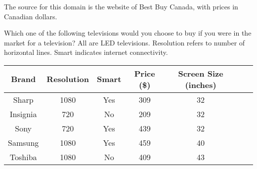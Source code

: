 The source for this domain is the website of Best Buy Canada, with prices in Canadian dollars.

\begin{tcolorbox}
Which one of the following televisions would you choose to buy if you
were in the market for a television? All are LED televisions. Resolution
refers to number of horizontal lines. Smart indicates internet connectivity.

\begin{tabular}{ccccccc}
\hline
Brand & Resolution & Smart & Price (\$) & Screen Size (inches) &  \\ \hline
Sharp & 1080 & Yes & 309 & 32 &  \\ 
Insignia & 720 & No & 209 & 32 &  \\ 
Sony & 720 & Yes & 439 & 32 &  \\ 
Samsung & 1080 & Yes & 459 & 40 &  \\ 
Toshiba & 1080 & No & 409 & 43 &  \\
\hline
\end{tabular}
\end{tcolorbox}
